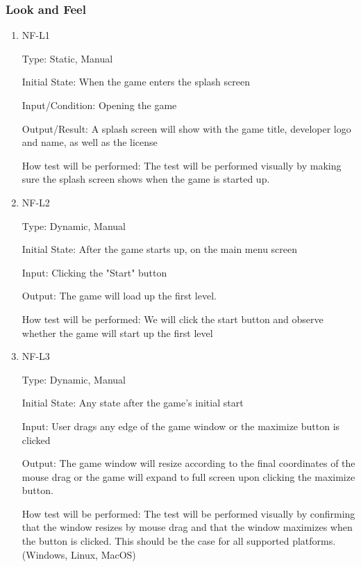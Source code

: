 \documentclass[12pt, titlepage]{article}
\begin{document}
\subsubsection{Look and Feel}

\begin{enumerate}

\item{NF-L1\\}

Type: Static, Manual
					
Initial State: When the game enters the splash screen
					
Input/Condition: Opening the game
					
Output/Result: A splash screen will show with the game title, developer logo and name, as well as the license
					
How test will be performed: The test will be performed visually by making sure the splash screen shows when the game is started up.

\item{NF-L2\\}

Type: Dynamic, Manual
					
Initial State: After the game starts up, on the main menu screen
					
Input: Clicking the "Start" button
					
Output: The game will load up the first level.
					
How test will be performed: We will click the start button and observe whether the game will start up the first level
					
\item{NF-L3\\}

Type: Dynamic, Manual
					
Initial State: Any state after the game's initial start
					
Input: User drags any edge of the game window or the maximize button is clicked
					
Output: The game window will resize according to the final coordinates of the mouse drag or the game will expand to full screen upon clicking the maximize button.
					
How test will be performed: The test will be performed visually by confirming that the window resizes by mouse drag and that the window maximizes when the button is clicked. This should be the case for all supported platforms. (Windows, Linux, MacOS)



\end{enumerate}
\end{document}

